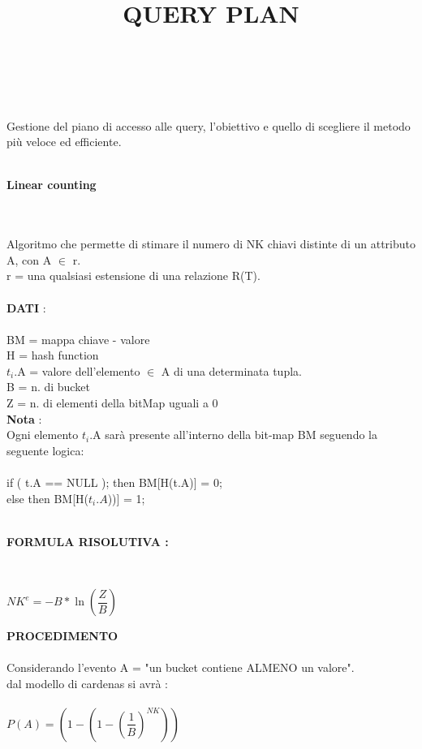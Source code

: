 \documentclass[a4paper,12pt]{article}
\begin{document}
	\begin{titlepage}
	\title{{\huge \textbf{QUERY PLAN}}} \\ \\
	\maketitle
	Gestione del piano di accesso alle query, l'obiettivo e quello di scegliere il metodo più veloce ed efficiente. \\ \\
	\centerline{{\Large \textbf{Linear counting}}} \\ \\
	Algoritmo che permette di stimare il numero di NK chiavi distinte di un attributo A, con A $\in$ r. \\
	r = una qualsiasi estensione di una relazione R(T). \\ \\
	\textbf{DATI} : \\ \\
	BM = mappa chiave - valore \\
	H = hash function \\
	$t_{i}$.A = valore dell'elemento $\in$ A di una determinata tupla. \\
	B = n. di bucket \\
	Z = n. di elementi della bitMap uguali a 0 \\ 
	\textbf{Nota} : \\
	Ogni elemento $t_{i}$.A sarà presente all'interno della bit-map 
	BM seguendo la seguente logica: \\ \\
	if ( t.A == NULL ); then BM[H(t.A)] = 0; \\
	else then BM[H($t_{i}.A$))] = 1; \\ \\
	\centerline{\textbf{FORMULA RISOLUTIVA : }} \\
	\begin{center}
		${NK^{e} = -B*\ln{(\dfrac{Z}{B})}}$  \\
	\end{center}
	\end{titlepage}
	\textbf{PROCEDIMENTO} \\ \\
	Considerando l'evento A = "un bucket contiene ALMENO un valore". \\
	dal modello di cardenas si avrà :\\ \\
	${P(A) = (1 - (1 - (\dfrac{1}{B})^{NK}))}$ \\
\end{document}
